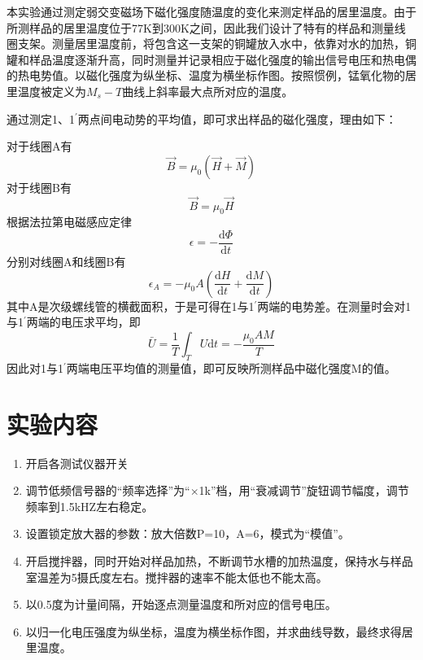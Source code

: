 \documentclass[a4paper]{article}
\begin{document}
本实验通过测定弱交变磁场下磁化强度随温度的变化来测定样品的居里温度。由于所测样品的居里温度位于77K到300K之间，因此我们设计了特有的样品和测量线圈支架。测量居里温度前，将包含这一支架的铜罐放入水中，依靠对水的加热，铜罐和样品温度逐渐升高，同时测量并记录相应于磁化强度的输出信号电压和热电偶的热电势值。以磁化强度为纵坐标、温度为横坐标作图。按照惯例，锰氧化物的居里温度被定义为$M_s - T$曲线上斜率最大点所对应的温度。

通过测定1、1$^{'}$两点间电动势的平均值，即可求出样品的磁化强度，理由如下：

对于线圈A有
\begin{equation*}
    \vec{B} = \mu_0(\vec{H}+\vec{M})
\end{equation*}
对于线圈B有
\begin{equation*}
    \vec{B} = \mu_0\vec{H}
\end{equation*}
根据法拉第电磁感应定律
\begin{equation*}
    \epsilon = -\frac{\text{d}\Phi}{\text{d}t}
\end{equation*}
分别对线圈A和线圈B有
\begin{equation*}
    \epsilon_A = -\mu_0A\left(\frac{\text{d}H}{\text{d}t} + \frac{\text{d}M}{\text{d}t}\right)
\end{equation*}
其中A是次级螺线管的横截面积，于是可得在1与1$^{'}$两端的电势差。在测量时会对1与1$^{'}$两端的电压求平均，即
\begin{equation*}
    \bar{U} = \frac{1}{T}\int_{T}U\text{d}t = -\frac{\mu_0AM}{T}
\end{equation*}
因此对1与1$^{'}$两端电压平均值的测量值，即可反映所测样品中磁化强度M的值。

\section{实验内容}
\begin{enumerate}
    \item 开启各测试仪器开关
    \item 调节低频信号器的“频率选择”为“$\times$1k”档，用“衰减调节”旋钮调节幅度，调节频率到1.5kHZ左右稳定。
    \item 设置锁定放大器的参数：放大倍数P=10，A=6，模式为“模值”。
    \item 开启搅拌器，同时开始对样品加热，不断调节水槽的加热温度，保持水与样品室温差为5摄氏度左右。搅拌器的速率不能太低也不能太高。
    \item 以0.5度为计量间隔，开始逐点测量温度和所对应的信号电压。
    \item 以归一化电压强度为纵坐标，温度为横坐标作图，并求曲线导数，最终求得居里温度。
\end{enumerate}
\end{document}
